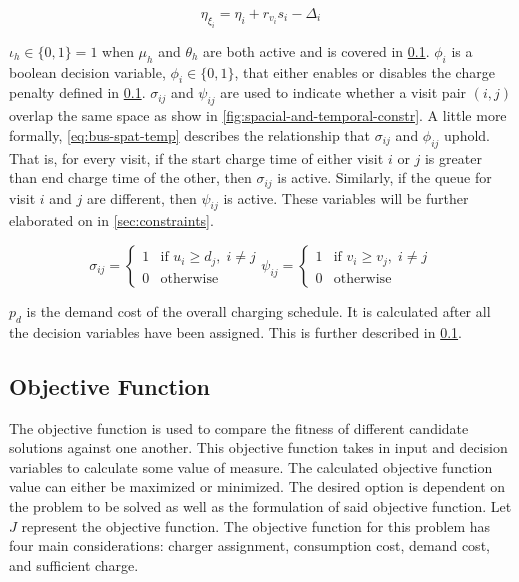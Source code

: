 \documentclass[11pt,a4paper,final]{article}
\begin{document}
\begin{equation}
\label{eq:bat-chain}
  \eta_{\xi_i} = \eta_i + r_{v_i}s_i - \Delta_i
\end{equation}

\(\iota_h \in \{0,1\} = 1\) when \(\mu_h\) and \(\theta_h\) are both active and is covered in \ref{sec:objective-function}. \(\phi_i\) is a boolean
decision variable, \(\phi_i \in \{0,1\}\), that either enables or disables the charge penalty defined in
\ref{sec:objective-function}. \(\sigma_{ij}\) and \(\psi_{ij}\) are used to indicate whether a visit pair \((i, j)\) overlap the same space
as show in \ref{fig:spacial-and-temporal-constr}. A little more formally, \ref{eq:bus-spat-temp} describes the relationship that
\(\sigma_{ij}\) and \(\phi_{ij}\) uphold. That is, for every visit, if the start charge time of either visit \(i\) or \(j\) is greater
than end charge time of the other, then \(\sigma_{ij}\) is active. Similarly, if the queue for visit \(i\) and \(j\) are different,
then \(\psi_{ij}\) is active. These variables will be further elaborated on in \ref{sec:constraints}.

\begin{subequations}
\label{eq:bus-spat-temp}
\begin{equation}
  \sigma_{ij} =
  \begin{cases}
    1 & \text{if } u_i \ge d_j, \; i \ne j\\
    0 & \text{otherwise}
  \end{cases}
\end{equation}

\begin{equation}
  \psi_{ij} =
  \begin{cases}
    1 & \text{if } v_i \ge v_j,\; i \ne j\\
    0 & \text{otherwise}
  \end{cases}
\end{equation}
\end{subequations}

\(p_d\) is the demand cost of the overall charging schedule. It is calculated after all the decision variables have been
assigned. This is further described in \ref{sec:objective-function}.

\subsection{Objective Function}
\label{sec:objective-function}
The objective function is used to compare the fitness of different candidate solutions against one another. This
objective function takes in input and decision variables to calculate some value of measure. The calculated objective
function value can either be maximized or minimized. The desired option is dependent on the problem to be solved as well
as the formulation of said objective function. Let \(J\) represent the objective function. The objective function for this
problem has four main considerations: charger assignment, consumption cost, demand cost, and sufficient charge.
\end{document}
